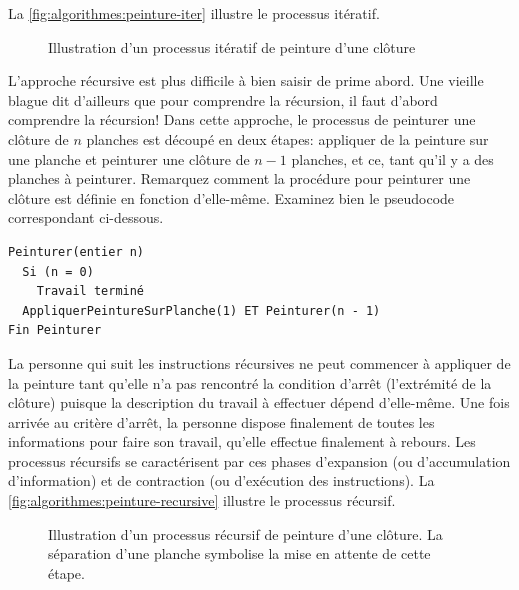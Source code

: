 La \autoref{fig:algorithmes:peinture-iter} illustre le processus itératif.

\begin{figure}
  \centering
  \setlength{\unitlength}{0.99mm}
  
  
  \caption{Illustration d'un processus itératif de peinture d'une
    clôture}
  \label{fig:algorithmes:peinture-iter}
\end{figure}

L'approche récursive est plus difficile à bien saisir de prime abord.
Une vieille blague dit d'ailleurs que pour comprendre la récursion, il
faut d'abord comprendre la récursion! Dans cette approche, le
processus de peinturer une clôture de $n$ planches est découpé en deux
étapes: appliquer de la peinture sur une planche et peinturer une
clôture de $n - 1$ planches, et ce, tant qu'il y a des planches à
peinturer. Remarquez comment la procédure pour peinturer une clôture
est définie en fonction d'elle-même. Examinez bien le pseudocode
correspondant ci-dessous.
\begin{pseudocode}
\begin{Verbatim}
Peinturer(entier n)
  Si (n = 0)
    Travail terminé
  AppliquerPeintureSurPlanche(1) ET Peinturer(n - 1)
Fin Peinturer
\end{Verbatim}
\end{pseudocode}

La personne qui suit les instructions récursives ne peut commencer à
appliquer de la peinture tant qu'elle n'a pas rencontré la condition
d'arrêt (l'extrémité de la clôture) puisque la description du travail
à effectuer dépend d'elle-même. Une fois arrivée au critère d'arrêt,
la personne dispose finalement de toutes les informations pour faire
son travail, qu'elle effectue finalement à rebours. Les processus
récursifs se caractérisent par ces phases d'expansion
(ou d'accumulation d'information) et de contraction
(ou d'exécution des instructions). La
\autoref{fig:algorithmes:peinture-recursive} illustre le processus
récursif.

\begin{figure}
  \centering
  \setlength{\unitlength}{0.99mm}
  
  
  \caption[Illustration d'un processus récursif de peinture d'une
  clôture]{Illustration d'un processus récursif de peinture d'une
    clôture. La séparation d'une planche symbolise la mise en attente
    de cette étape.}
  \label{fig:algorithmes:peinture-recursive}
\end{figure}

